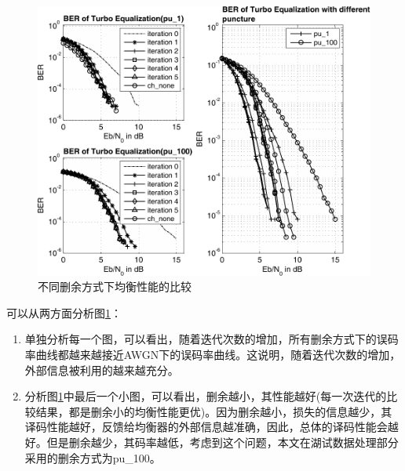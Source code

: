 \begin{figure}[htb]
  \begin{center}
    \includegraphics[width=\textwidth]{images/different_puncture_separate.pdf}
  \end{center}
  \caption{不同删余方式下均衡性能的比较}
  \label{fig:3.6}
\end{figure}

可以从两方面分析图\ref{fig:3.6}：
\begin{enumerate}
    \item
        单独分析每一个图，可以看出，随着迭代次数的增加，所有删余方式下的误码率曲线都越来越接近AWGN下的误码率曲线。这说明，随着迭代次数的增加，外部信息被利用的越来越充分。
    \item
        分析图\ref{fig:3.6}中最后一个小图，可以看出，删余越小，其性能越好(每一次迭代的比较结果，都是删余小的均衡性能更优)。因为删余越小，损失的信息越少，其译码性能越好，反馈给均衡器的外部信息越准确，因此，总体的译码性能会越好。但是删余越少，其码率越低，考虑到这个问题，本文在湖试数据处理部分采用的删余方式为pu\_100。
\end{enumerate}

